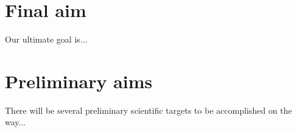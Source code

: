 



\graphicspath{{2/figures/}}

\section{Final aim}

Our ultimate goal is...

\section{Preliminary aims}

There will be several preliminary scientific targets to be accomplished on the way...





